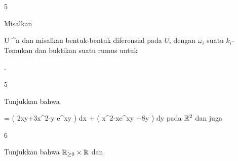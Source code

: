{5}
{

Misalkan

\mavergleichskette
{\vergleichskette
{ U
}
{ \subseteq }{ \R^n
}
{  }{
}
{    }{
}
{   }{
}
}
{}{}{}
dan misalkan
 bentuk-bentuk diferensial pada $U$, dengan $\omega_i$ suatu
$k_i$-
Temukan dan buktikan suatu rumus untuk

 { . }

}
{} {}

{5}
{

Tunjukkan bahwa

\mavergleichskettedisp
{\vergleichskette
{ \omega
}
{ =} { \left(  2xy+3x^2-y e^{xy}  \right) dx + \left(  x^2-xe^{xy} +8y  \right)  dy
}
{ } {
}
{ } {
}
{ } {
}
}
{}{}{}
pada ${\mathbb R}^2$
dan juga

}
{} {}

{6}
{

Tunjukkan bahwa
${\mathbb R}_{\geq 0} \times {\mathbb R}$ dan


}
{} {}
